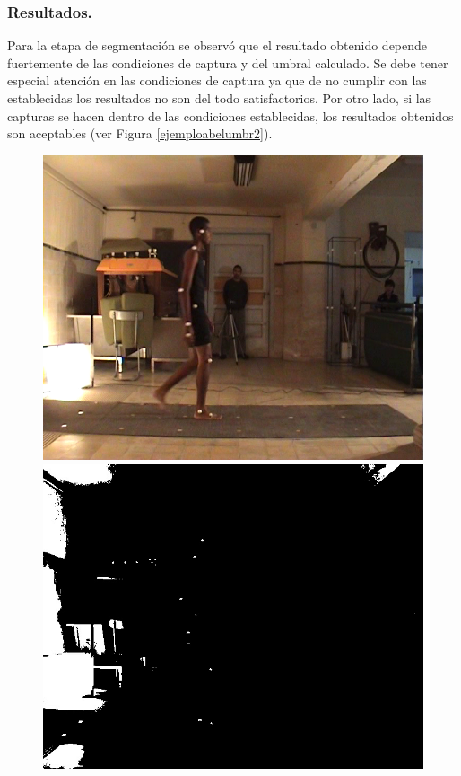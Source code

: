 \subsubsection{Resultados.}
Para la etapa de segmentación se observó que el resultado obtenido depende fuertemente de las condiciones de captura y del umbral calculado. Se debe tener especial atención en las condiciones de captura ya que de no cumplir con las establecidas los resultados no son del todo satisfactorios. Por otro lado, si las capturas se hacen dentro de las condiciones establecidas, los resultados obtenidos son aceptables (ver Figura \ref{ejemploabelumbr2}).
%
\begin{figure}[ht!]
      \centering
        {\includegraphics[scale=0.10]{imagenes/abel_original_video.png}\label{abelvideo}}\hspace{1 mm}
        {\includegraphics[scale=0.10]{imagenes/abel_original_filtro.png}\label{abelfiltro}}

\end{figure}

